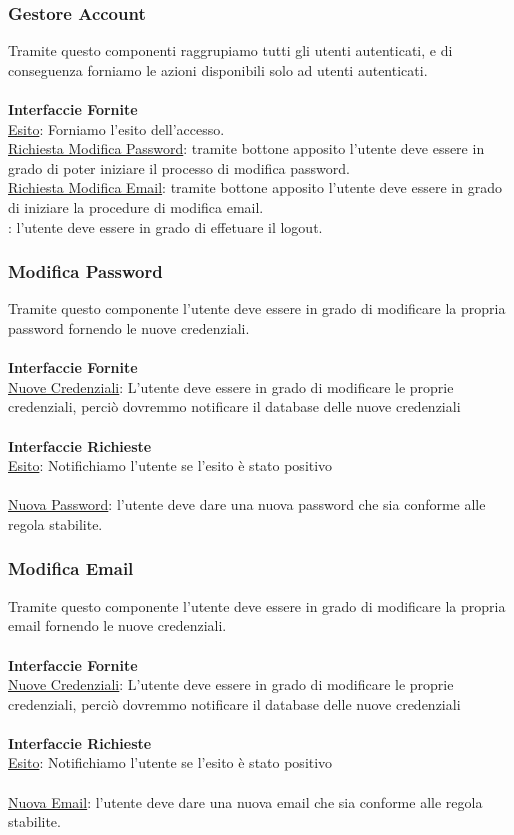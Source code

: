 \documentclass[11pt, a4paper]{article}
\theoremstyle{definition} %
\begin{document}
\subsubsection{Gestore Account}
Tramite questo componenti raggrupiamo tutti gli utenti autenticati, e di conseguenza forniamo le azioni disponibili solo ad utenti autenticati.
\\\\\textbf{Interfaccie Fornite}
\\\underline{Esito}: Forniamo l'esito dell'accesso.
\\\underline{Richiesta Modifica Password}: tramite bottone apposito l'utente deve essere in grado di poter iniziare il processo di modifica password.
\\\underline{Richiesta Modifica Email}: tramite bottone apposito l'utente deve essere in grado di iniziare la procedure di modifica email.
\\: l'utente deve essere in grado di effetuare il logout.

\subsubsection{Modifica Password}
Tramite questo componente l'utente deve essere in grado di modificare la propria password fornendo le nuove credenziali.
\\\\\textbf{Interfaccie Fornite}\\
\underline{Nuove Credenziali}: L'utente deve essere in grado di modificare le proprie credenziali, perciò dovremmo notificare il database delle nuove credenziali
\\\\\textbf{Interfaccie Richieste}\\
\underline{Esito}: Notifichiamo l'utente se l'esito è stato positivo\\\\
\underline{Nuova Password}: l'utente deve dare una nuova password che sia conforme alle regola stabilite.

\subsubsection{Modifica Email}
Tramite questo componente l'utente deve essere in grado di modificare la propria email fornendo le nuove credenziali.
\\\\\textbf{Interfaccie Fornite}\\
\underline{Nuove Credenziali}: L'utente deve essere in grado di modificare le proprie credenziali, perciò dovremmo notificare il database delle nuove credenziali
\\\\\textbf{Interfaccie Richieste}\\
\underline{Esito}: Notifichiamo l'utente se l'esito è stato positivo
\\\\
\underline{Nuova Email}: l'utente deve dare una nuova email che sia conforme alle regola stabilite.
\end{document}
